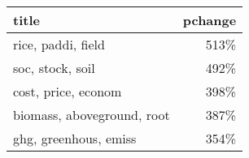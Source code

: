 \begin{tabular}{p{1.2cm}r}
\toprule
                      title &  pchange \\
\midrule
         rice, paddi, field &     513\% \\
           soc, stock, soil &     492\% \\
        cost, price, econom &     398\% \\
 biomass, aboveground, root &     387\% \\
      ghg, greenhous, emiss &     354\% \\
\bottomrule
\end{tabular}
